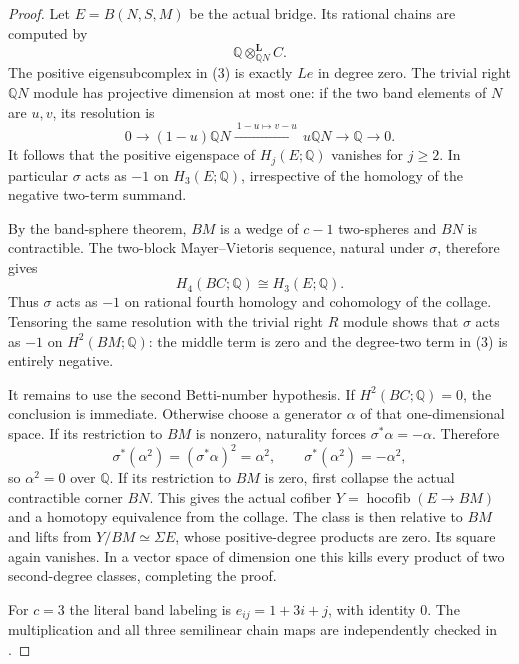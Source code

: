 \begin{proof}
Let $E=B(N,S,M)$ be the actual bridge.  Its rational
chains are computed by
\[
 \mathbb Q\otimes_{\mathbb QN}^{\mathbf L}C.
\]
The positive eigensubcomplex in (3) is exactly $Le$
in degree zero.  The trivial right $\mathbb QN$ module
has projective dimension at most one: if the two band
elements of $N$ are $u,v$, its resolution is
\[
 0\longrightarrow(1-u)\mathbb QN
  \xrightarrow{\ 1-u\mapsto v-u\ }u\mathbb QN
  \longrightarrow\mathbb Q\longrightarrow0.
\]
It follows that the positive eigenspace of $H_j(E;\mathbb Q)$
vanishes for $j\ge2$.  In particular $\sigma$ acts as
$-1$ on $H_3(E;\mathbb Q)$, irrespective of the
homology of the negative two-term summand.

By the band-sphere theorem, $BM$ is a wedge of
$c-1$ two-spheres and $BN$ is contractible.  The
two-block Mayer--Vietoris sequence, natural under
$\sigma$, therefore gives
\[
 H_4(BC;\mathbb Q)\cong H_3(E;\mathbb Q).
\]
Thus $\sigma$ acts as $-1$ on rational fourth homology
and cohomology of the collage.  Tensoring the same
resolution with the trivial right $R$ module shows
that $\sigma$ acts as $-1$ on $H^2(BM;\mathbb Q)$:
the middle term is zero and the degree-two term in
(3) is entirely negative.

It remains to use the second Betti-number hypothesis.
If $H^2(BC;\mathbb Q)=0$, the conclusion is immediate.
Otherwise choose a generator $\alpha$ of that one-dimensional
space.  If its restriction to $BM$ is nonzero, naturality
forces $\sigma^*\alpha=-\alpha$.  Therefore
\[
 \sigma^*(\alpha^2)=(\sigma^*\alpha)^2=\alpha^2,
 \qquad \sigma^*(\alpha^2)=-\alpha^2,
\]
so $\alpha^2=0$ over $\mathbb Q$.
If its restriction to $BM$ is zero, first collapse
the actual contractible corner $BN$.  This gives
the actual cofiber $Y=\operatorname{hocofib}(E\to BM)$
and a homotopy equivalence from the collage.
The class is then relative to $BM$ and lifts from
$Y/BM\simeq\Sigma E$, whose positive-degree products
are zero.  Its square again vanishes.  In a vector
space of dimension one this kills every product of
two second-degree classes, completing the proof.

For $c=3$ the literal band labeling is
$e_{ij}=1+3i+j$, with identity $0$.
The multiplication and all three semilinear chain
maps are independently checked in
.
\end{proof}
